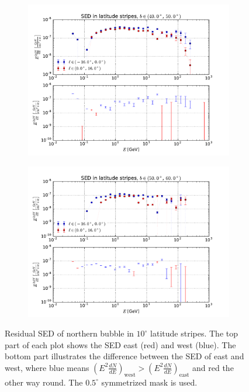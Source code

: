 \documentclass[a4paper]{article}
\begin{document}
\begin{figure}
\begin{subfigure}{0.5\textwidth}
        \includegraphics[width=\textwidth]{spectrum_of_top_bubble_in_lat_stripes_40-50.pdf}
    \end{subfigure} 
    \begin{subfigure}{0.5\textwidth}
        \includegraphics[width=\textwidth]{spectrum_of_top_bubble_in_lat_stripes_50-60.pdf}
    \end{subfigure}
    \caption{Residual SED of northern bubble in $10^\circ$ latitude stripes. The top part of each plot shows the SED east (red) and west (blue). The bottom part illustrates the difference between the SED of east and west, where blue means $\left(E^2\frac{dN}{dE}\right)_\mathrm{west} > \left(E^2\frac{dN}{dE}\right)_\mathrm{east}$ and red the other way round. The $0.5^\circ$ symmetrized mask is used.}
\end{figure}
\end{document}
